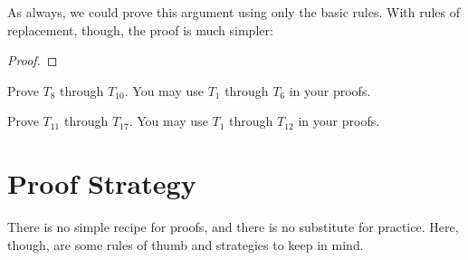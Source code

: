 As always, we could prove this argument using only the basic rules. With rules of replacement, though, the proof is much simpler:

 

\begin{proof}
\end{proof}









 

\practiceproblems
\noindent\problempart
Prove $T_{8}$ through $T_{10}$. You may use $T_{1}$ through $T_6$ in your proofs.

\noindent\problempart
Prove $T_{11}$ through $T_{17}$. You may use $T_{1}$ through $T_{12}$ in your proofs.






\section{Proof Strategy}
\setlength{\parindent}{1em}
There is no simple recipe for proofs, and there is no substitute for practice. Here, though, are some rules of thumb and strategies to keep in mind.

